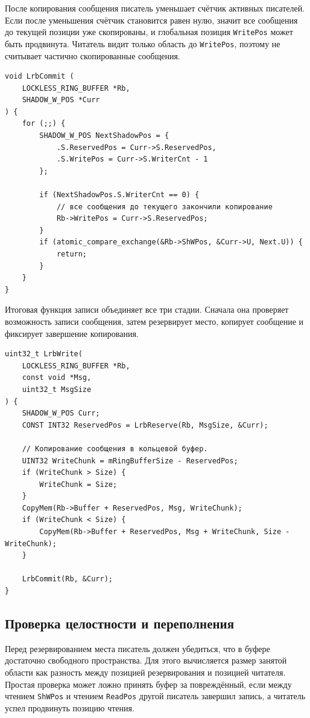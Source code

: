 После копирования сообщения писатель уменьшает счётчик активных писателей. Если
после уменьшения счётчик становится равен нулю, значит все сообщения до текущей
позиции уже скопированы, и глобальная позиция \texttt{WritePos} может быть
продвинута. Читатель видит только область до \texttt{WritePos}, поэтому не
считывает частично скопированные сообщения.

\begin{lstlisting}
void LrbCommit (
    LOCKLESS_RING_BUFFER *Rb,
    SHADOW_W_POS *Curr
) {
    for (;;) {
        SHADOW_W_POS NextShadowPos = {
            .S.ReservedPos = Curr->S.ReservedPos,
            .S.WritePos = Curr->S.WriterCnt - 1
        };

        if (NextShadowPos.S.WriterCnt == 0) {
            // все сообщения до текущего закончили копирование
            Rb->WritePos = Curr->S.ReservedPos;
        }
        if (atomic_compare_exchange(&Rb->ShWPos, &Curr->U, Next.U)) {
            return;
        }
    }
}
\end{lstlisting}

Итоговая функция записи объединяет все три стадии. Сначала она проверяет
возможность записи сообщения, затем резервирует место, копирует сообщение и
фиксирует завершение копирования.

\begin{lstlisting}
uint32_t LrbWrite(
    LOCKLESS_RING_BUFFER *Rb,
    const void *Msg,
    uint32_t MsgSize
) {
    SHADOW_W_POS Curr;
    CONST INT32 ReservedPos = LrbReserve(Rb, MsgSize, &Curr);

    // Копирование сообщения в кольцевой буфер.
    UINT32 WriteChunk = mRingBufferSize - ReservedPos;
    if (WriteChunk > Size) {
        WriteChunk = Size;
    }
    CopyMem(Rb->Buffer + ReservedPos, Msg, WriteChunk);
    if (WriteChunk < Size) {
        CopyMem(Rb->Buffer + ReservedPos, Msg + WriteChunk, Size - WriteChunk);
    }

    LrbCommit(Rb, &Curr);
}
\end{lstlisting}

\subsection{Проверка целостности и переполнения}
\label{sec:ch2-integrity}

Перед резервированием места писатель должен убедиться, что в буфере достаточно
свободного пространства. Для этого вычисляется размер занятой области как
разность между позицией резервирования и позицией читателя. Простая проверка
может ложно принять буфер за повреждённый, если между чтением
\texttt{ShWPos} и чтением \texttt{ReadPos} другой писатель завершил запись, а
читатель успел продвинуть позицию чтения.

